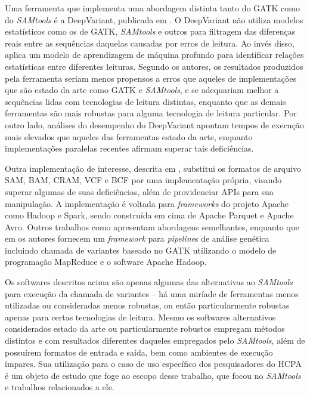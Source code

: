 \documentclass[cic,tc]{iiufrgs}
\begin{document}
Uma ferramenta que implementa uma abordagem distinta tanto do GATK como do
\textit{SAMtools} é a DeepVariant, publicada em \cite{poplin2018universal}. O DeepVariant
não utiliza modelos estatísticos como os de GATK, \textit{SAMtools} e outros para
filtragem das diferenças reais entre as sequências daquelas causadas por erros
de leitura. Ao invés disso, aplica um modelo de aprendizagem de máquina
profundo para identificar relações estatísticas entre diferentes leituras.
Segundo os autores, os resultados produzidos pela ferramenta seriam menos
propensos a erros que aqueles de implementações que são estado da arte como
GATK e \textit{SAMtools}, e se adequariam melhor a sequências lidas com tecnologias de
leitura distintas, enquanto que as demais ferramentas são mais robustas para
alguma tecnologia de leitura particular. Por outro lado, análises do desempenho
do DeepVariant apontam tempos de execução mais elevados que aqueles das
ferramentas estado da arte, enquanto implementações paralelas recentes afirmam
superar tais deficiências. \cite{ahmad2021vc}

Outra implementação de interesse, descrita em \cite{massie2013adam}, substitui
os formatos de arquivo SAM, BAM, CRAM, VCF e BCF por uma implementação própria,
visando superar algumas de suas deficiências, além de providenciar APIs para
sua manipulação. A implementação é voltada para \textit{frameworks} do projeto Apache
como Hadoop e Spark, sendo construída em cima de Apache Parquet e Apache Avro.
Outros trabalhos como \cite{boufea2017managing} apresentam abordagens
semelhantes, enquanto que em \cite{decap2015halvade} os autores fornecem um
\textit{framework} para \textit{pipeline}s de análise genética incluindo chamada de variantes
baseado no GATK utilizando o modelo de programação MapReduce e o software
Apache Hadoop.

Os softwares descritos acima são apenas algumas das alternativas ao \textit{SAMtools}
para execução da chamada de variantes -- há uma miríade de ferramentas menos
utilizadas ou consideradas menos robustas, ou então particularmente robustas
apenas para certas tecnologias de leitura. Mesmo os softwares alternativos
considerados estado da arte ou particularmente robustos empregam métodos
distintos e com resultados diferentes daqueles empregados pelo \textit{SAMtools}, além
de possuírem formatos de entrada e saída, bem como ambientes de execução
ímpares. Sua utilização para o caso de uso específico dos pesquisadores do HCPA
é um objeto de estudo que foge ao escopo desse trabalho, que focou no \textit{SAMtools}
e trabalhos relacionados a ele.
\end{document}
